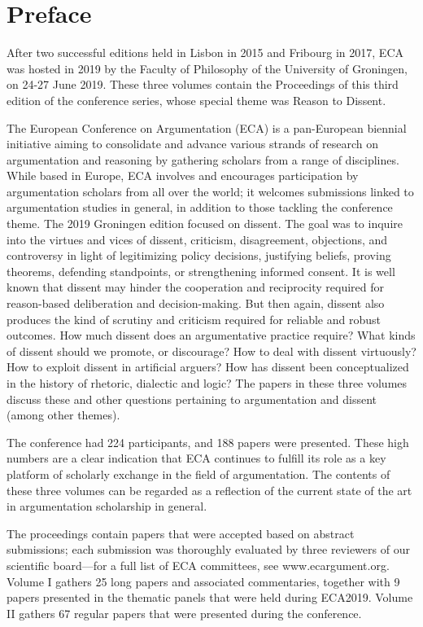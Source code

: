 \section*{Preface}

After two successful editions held in Lisbon in 2015 and Fribourg in 2017, ECA was hosted in 2019 by the Faculty of Philosophy of the University of Groningen, on 24-27 June 2019. These three volumes contain the Proceedings of this third edition of the conference series, whose special theme was Reason to Dissent.

The European Conference on Argumentation (ECA) is a pan-European biennial initiative aiming to consolidate and advance various strands of research on argumentation and reasoning by gathering scholars from a range of disciplines. While based in Europe, ECA involves and encourages participation by argumentation scholars from all over the world; it welcomes submissions linked to argumentation studies in general, in addition to those tackling the conference theme. The 2019 Groningen edition focused on dissent. The goal was to inquire into the virtues and vices of dissent, criticism, disagreement, objections, and controversy in light of legitimizing policy decisions, justifying beliefs, proving theorems, defending standpoints, or strengthening informed consent. It is well known that dissent may hinder the cooperation and reciprocity required for reason-based deliberation and decision-making. But then again, dissent also produces the kind of scrutiny and criticism required for reliable and robust outcomes. How much dissent does an argumentative practice require? What kinds of dissent should we promote, or discourage? How to deal with dissent virtuously? How to exploit dissent in artificial arguers? How has dissent been conceptualized in the history of rhetoric, dialectic and logic? The papers in these three volumes discuss these and other questions pertaining to argumentation and dissent (among other themes).

The conference had 224 participants, and 188 papers were presented. These high numbers are a clear indication that ECA continues to fulfill its role as a key platform of scholarly exchange in the field of argumentation. The contents of these three volumes can be regarded as a reflection of the current state of the art in argumentation scholarship in general.

The proceedings contain papers that were accepted based on abstract submissions; each submission was thoroughly evaluated by three reviewers of our scientific board—for a full list of ECA committees, see www.ecargument.org. Volume I gathers 25 long papers and associated commentaries, together with 9 papers presented in the thematic panels that were held during ECA2019. Volume II gathers 67 regular papers that were presented during the conference. 


